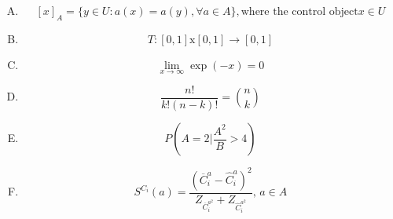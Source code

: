 \documentclass[12pt, letterpaper, titlepage]{article}
\begin{document}
\begin{enumerate}[A.]
\item $$ [x]_{A} = \{y \in U : a(x) = a(y), \forall a\in A\}, \textrm{where the control object} x \in U $$

\item $$ T:[0,1] \textrm{x} [0,1] \rightarrow [0,1] $$

\item $$ \lim_{x\to\infty} \exp(-x) = 0 $$

\item $$ \frac{n!}{k!(n-k)!} = {n \choose k} $$

\item $$ P\left( A=2 \bigg| \frac{A^{2}}{B} > 4 \right) $$

\item $$ S^{C_{i}}(a) = \frac{(\overline{C}_{i}^{a} - \hat{C}_{i}^{a})^{2}}{Z_{\overline{C}_{i}^{a^{2}}} + Z_{\hat{C}_{i}^{a^{2}}}} \textrm{, } a\in A $$

\end{enumerate}
\end{document}
